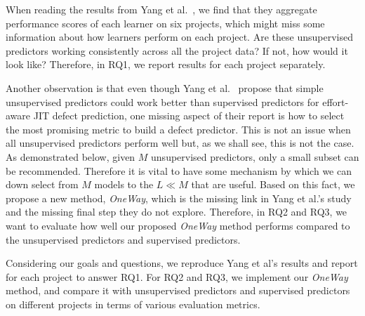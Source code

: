 \documentclass[sigconf]{acmart}
\theoremstyle{break}
\begin{document}
When reading the results from Yang et al.~\cite{yang2016effort},
we find that they aggregate performance scores of each learner on six projects, which might miss some information about how learners perform on each project. Are these unsupervised predictors working consistently across all the project data? If not, how would it look like? Therefore, in RQ1, we report results for each project separately.



Another observation is that even though Yang et al.~\cite{yang2016effort} propose that 
simple unsupervised predictors could work better than supervised predictors for effort-aware JIT defect prediction, one missing aspect of their report is how to select the most promising metric  to build a defect predictor. This is not an issue when all unsupervised predictors perform well but, as we shall see, this is not the case. As demonstrated below, given $M$ unsupervised predictors, only a small subset can be recommended. Therefore it is vital to have some mechanism by which we can down select from $M$ models to the $L \ll M$ that are 
useful. Based on this fact, we propose a new method, {\it OneWay}, which is the missing link in Yang et al.'s study~\cite{yang2016effort} and the missing final step they do not explore. Therefore,
in RQ2 and RQ3, we want to evaluate how well our proposed {\it OneWay} method performs compared to the unsupervised predictors and supervised predictors.



Considering our goals and questions, we reproduce Yang et al's results
and report for each project to answer RQ1. For RQ2 and RQ3, we implement our {\it OneWay}
method, and compare it with unsupervised predictors and supervised predictors on different projects in terms of various evaluation metrics.
\end{document}
